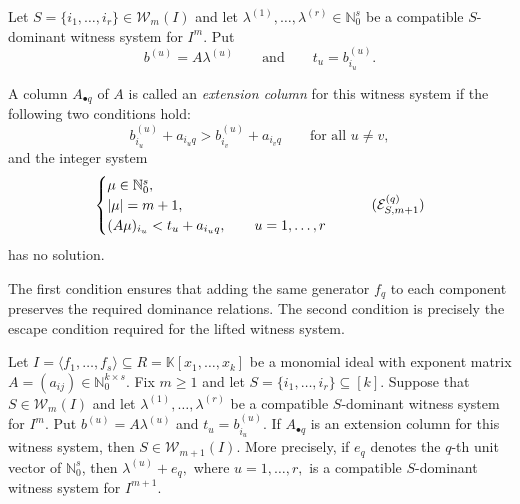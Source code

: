 \documentclass[11pt]{amsart}   %
\begin{document}
\begin{defn} \label{def:extension_column}
Let $S=\{i_1,\ldots,i_r\}\in\mathcal W_m(I)$ and let
 $\lambda^{(1)},\ldots,\lambda^{(r)}
\in\mathbb N_0^s$ be a compatible $S$-dominant witness system for $I^m$.  Put
\[
b^{(u)}=A\lambda^{(u)}
\qquad\text{and}\qquad
t_u=b^{(u)}_{i_u}.
\]

A column $A_{\bullet q}$ of $A$ is called an
\emph{extension column} for this witness system if the following two
conditions hold:
\begin{equation}
b^{(u)}_{i_u}+a_{i_uq}
>
b^{(u)}_{i_v}+a_{i_vq}
\qquad
\text{for all }u\neq v,
\tag{E1}
\label{eq:extension_dominance}
\end{equation}
and the integer system
\begin{equation}
\begin{cases}
\mu\in\mathbb N_0^s,\\
|\mu|=m+1,\\
(A\mu)_{i_u}<t_u+a_{i_uq},
\qquad u=1,\ldots,r
\end{cases}
\tag{$\mathcal E^{(q)}_{S,m+1}$}
\label{eq:extension_escape}
\end{equation}
has no solution.
\end{defn}

The first condition ensures that adding the same generator $f_q$ to
each component preserves the required dominance relations.  The second
condition is precisely the escape condition required for the lifted
witness system.

\begin{thm}\label{thm:matrix_extension}
Let $I=\langle f_1,\ldots,f_s\rangle\subseteq R=\mathbb K[x_1,\ldots,x_k]$
be a monomial ideal with exponent matrix $A=(a_{ij})\in\mathbb N_0^{k\times s}.$
Fix $m\geq1$ and let $S=\{i_1,\ldots,i_r\}\subseteq[k].$ Suppose that
 $S\in\mathcal W_m(I)$ and let  $\lambda^{(1)},\ldots,\lambda^{(r)}$
be a compatible $S$-dominant witness system for $I^m$.  Put
 $b^{(u)}=A\lambda^{(u)}$ and $t_u=b^{(u)}_{i_u}.$
If $A_{\bullet q}$ is an extension column for this witness system,
then $S\in\mathcal W_{m+1}(I).$
More precisely, if $e_q$ denotes the $q$-th unit vector of
$\mathbb N_0^s$, then $\lambda^{(u)}+e_q,$ where
$u=1,\ldots,r,$ is a compatible $S$-dominant witness system for $I^{m+1}$.
\end{thm}
\end{document}
